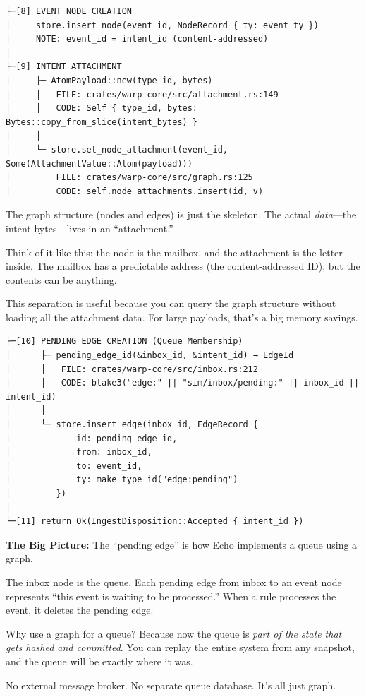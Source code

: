 \documentclass[11pt]{book}
\newenvironment{directors}
{\begin{mdframed}[
  linecolor=blue!60,
  linewidth=2pt,
  leftline=true,
  rightline=false,
  topline=false,
  bottomline=false,
  backgroundcolor=blue!3,
  innerleftmargin=12pt,
  innerrightmargin=10pt,
  innertopmargin=8pt,
  innerbottommargin=8pt,
  skipabove=12pt,
  skipbelow=12pt
]\small\sffamily\color{blue!70!black}}
{\end{mdframed}}
\newenvironment{bigpicture}
{\begin{mdframed}[
  linecolor=purple!60,
  linewidth=2pt,
  leftline=true,
  rightline=false,
  topline=false,
  bottomline=false,
  backgroundcolor=purple!3,
  innerleftmargin=12pt,
  innerrightmargin=10pt,
  innertopmargin=8pt,
  innerbottommargin=8pt,
  skipabove=12pt,
  skipbelow=12pt
]\small\sffamily\color{purple!70!black}\textbf{The Big Picture:} }
{\end{mdframed}}
\begin{document}
\begin{verbatim}
├─[8] EVENT NODE CREATION
│     store.insert_node(event_id, NodeRecord { ty: event_ty })
│     NOTE: event_id = intent_id (content-addressed)
│
├─[9] INTENT ATTACHMENT
│     ├─ AtomPayload::new(type_id, bytes)
│     │   FILE: crates/warp-core/src/attachment.rs:149
│     │   CODE: Self { type_id, bytes: Bytes::copy_from_slice(intent_bytes) }
│     │
│     └─ store.set_node_attachment(event_id, Some(AttachmentValue::Atom(payload)))
│         FILE: crates/warp-core/src/graph.rs:125
│         CODE: self.node_attachments.insert(id, v)
\end{verbatim}

\begin{directors}
The graph structure (nodes and edges) is just the skeleton. The actual \emph{data}---the intent bytes---lives in an ``attachment.''

Think of it like this: the node is the mailbox, and the attachment is the letter inside. The mailbox has a predictable address (the content-addressed ID), but the contents can be anything.

This separation is useful because you can query the graph structure without loading all the attachment data. For large payloads, that's a big memory savings.
\end{directors}

\begin{verbatim}
├─[10] PENDING EDGE CREATION (Queue Membership)
│      ├─ pending_edge_id(&inbox_id, &intent_id) → EdgeId
│      │   FILE: crates/warp-core/src/inbox.rs:212
│      │   CODE: blake3("edge:" || "sim/inbox/pending:" || inbox_id || intent_id)
│      │
│      └─ store.insert_edge(inbox_id, EdgeRecord {
│             id: pending_edge_id,
│             from: inbox_id,
│             to: event_id,
│             ty: make_type_id("edge:pending")
│         })
│
└─[11] return Ok(IngestDisposition::Accepted { intent_id })
\end{verbatim}

\begin{bigpicture}
The ``pending edge'' is how Echo implements a queue using a graph.

The inbox node is the queue. Each pending edge from inbox to an event node represents ``this event is waiting to be processed.'' When a rule processes the event, it deletes the pending edge.

Why use a graph for a queue? Because now the queue is \emph{part of the state that gets hashed and committed}. You can replay the entire system from any snapshot, and the queue will be exactly where it was.

No external message broker. No separate queue database. It's all just graph.
\end{bigpicture}
\end{document}
